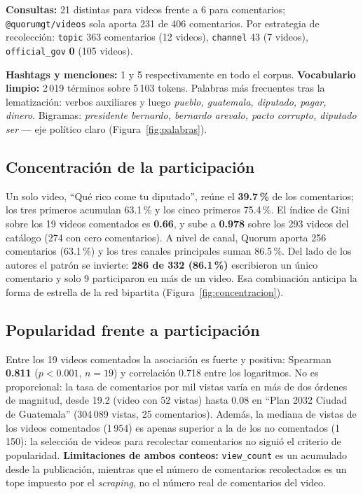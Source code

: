 \documentclass[11pt,a4paper]{article}
\begin{document}
\textbf{Consultas:} 21 distintas para videos frente a 6 para comentarios; \texttt{@quorumgt/videos}
sola aporta 231 de 406 comentarios. Por estrategia de recolecci\'on: \texttt{topic} 363 comentarios
(12 videos), \texttt{channel} 43 (7 videos), \texttt{official\_gov} \textbf{0} (105 videos).

\textbf{Hashtags y menciones:} 1 y 5 respectivamente en todo el corpus.
\textbf{Vocabulario limpio:} 2\,019 t\'erminos sobre 5\,103 tokens. Palabras m\'as frecuentes tras la
lematizaci\'on: verbos auxiliares y luego \emph{pueblo, guatemala, diputado, pagar, dinero}. Bigramas:
\emph{presidente bernardo, bernardo arevalo, pacto corrupto, diputado ser} --- eje pol\'itico claro
(Figura~\ref{fig:palabras}).

\subsection{Concentraci\'on de la participaci\'on}
Un solo video, ``Qu\'e rico come tu diputado'', re\'une el \textbf{39.7\,\%} de los comentarios; los
tres primeros acumulan 63.1\,\% y los cinco primeros 75.4\,\%. El \'indice de Gini sobre los 19 videos
comentados es \textbf{0.66}, y sube a \textbf{0.978} sobre los 293 videos del cat\'alogo (274 con cero
comentarios). A nivel de canal, Quorum aporta 256 comentarios (63.1\,\%) y los tres canales principales
suman 86.5\,\%. Del lado de los autores el patr\'on se invierte: \textbf{286 de 332 (86.1\,\%)}
escribieron un \'unico comentario y solo 9 participaron en m\'as de un video. Esa combinaci\'on
anticipa la forma de estrella de la red bipartita (Figura~\ref{fig:concentracion}).

\subsection{Popularidad frente a participaci\'on}
Entre los 19 videos comentados la asociaci\'on es fuerte y positiva: Spearman \textbf{0.811}
($p<0.001$, $n=19$) y correlaci\'on 0.718 entre los logaritmos. No es proporcional: la tasa de
comentarios por mil vistas var\'ia en m\'as de dos \'ordenes de magnitud, desde 19.2 (video con 52
vistas) hasta 0.08 en ``Plan 2032 Ciudad de Guatemala'' (304\,089 vistas, 25 comentarios). Adem\'as,
la mediana de vistas de los videos comentados (1\,954) es apenas superior a la de los no comentados
(1\,150): la selecci\'on de videos para recolectar comentarios no sigui\'o el criterio de popularidad.
\textbf{Limitaciones de ambos conteos:} \texttt{view\_count} es un acumulado desde la publicaci\'on,
mientras que el n\'umero de comentarios recolectados es un tope impuesto por el \emph{scraping}, no el
n\'umero real de comentarios del video.
\end{document}
